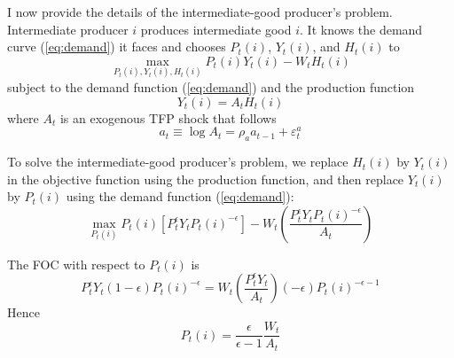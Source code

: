 \documentclass[12pt]{article}
\begin{document}
I now provide the details of the intermediate-good producer's problem. Intermediate producer $i$ produces intermediate good $i$. It knows the demand curve (\ref{eq:demand}) it faces and chooses $P_t(i)$, $Y_t(i)$, and $H_t(i)$ to
\begin{equation}
	\max_{P_t(i), Y_t(i), H_t(i)} P_t(i) Y_t(i) - W_t H_t(i)
\end{equation}
subject to the demand function (\ref{eq:demand}) and the production function
\begin{equation} \label{eq:prod}
	Y_t(i) = A_t H_t(i)
\end{equation}
where $A_t$ is an exogenous TFP shock that follows
\begin{equation}
	a_t \equiv \log A_t = \rho_a a_{t-1} + \varepsilon_t^a
\end{equation}

To solve the intermediate-good producer's problem, we replace $H_t(i)$ by $Y_t(i)$ in the objective function using the production function, and then replace $Y_t(i)$ by $P_t(i)$ using the demand function (\ref{eq:demand}):
\[ \max_{P_t(i)} P_t(i) \left[P_t^{\epsilon} Y_t P_t(i)^{-\epsilon}\right] - W_t \left(\frac{P_t^{\epsilon} Y_t P_t(i)^{-\epsilon}}{A_t}\right)\]

The FOC with respect to $P_t(i)$ is
\begin{equation}
	P_t^\epsilon Y_t (1-\epsilon) P_t(i)^{-\epsilon} = W_t \left(\frac{P_t^\epsilon Y_t}{A_t}\right) (-\epsilon) P_t(i)^{-\epsilon-1}
\end{equation}
Hence
\begin{equation} \label{eq:flex_price}
	P_t(i) = \frac{\epsilon}{\epsilon - 1} \frac{W_t}{A_t}
\end{equation}
\end{document}
